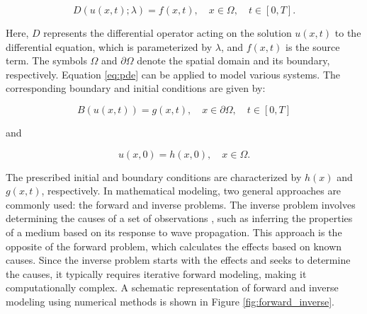 \documentclass[11pt,twoside]{article}
\begin{document}
\begin{equation*}
D(u(x,t); \lambda) = f(x,t), \quad x \in \Omega, \quad t \in [0, T] .\label{eq:pde}
\end{equation*}
 
Here, $D$ represents the differential operator acting on the solution $u(x,t)$ to the differential equation, which is 
parameterized by $\lambda$, and $f(x,t)$ is the source term. The symbols $\Omega$ and $\partial\Omega$ denote the spatial 
domain and its boundary, respectively. Equation \ref{eq:pde} can be applied to model various systems. The corresponding 
boundary and initial conditions are given by:

\begin{equation*}
B (u(x, t)) = g(x, t), \quad x \in \partial \Omega, \quad t \in [0, T] 
\end{equation*}

and

\begin{equation*}
u(x, 0) = h(x, 0), \quad x \in \Omega .
\end{equation*}

The prescribed initial and boundary conditions are characterized by $h(x)$ and $g(x,t)$, respectively. In mathematical 
modeling, two general approaches are commonly used: the forward and inverse problems. The inverse problem involves 
determining the causes of a set of observations \citep{roth_neural_1994,Tarantola}, such as inferring the properties 
of a medium based on its response to wave propagation. This approach is the opposite of the forward problem, which 
calculates the effects based on known causes. Since the inverse problem starts with the effects and seeks to determine 
the causes, it typically requires iterative forward modeling, making it computationally complex. A schematic representation 
of forward and inverse modeling using numerical methods is shown in Figure \ref{fig:forward_inverse}.
\end{document}
